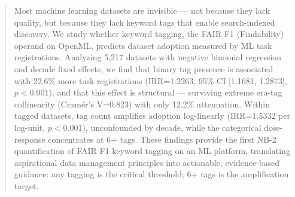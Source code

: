 \begin{abstract}
Most machine learning datasets are invisible --- not because they lack quality, but because they lack keyword tags that enable search-indexed discovery. We study whether keyword tagging, the FAIR F1 (Findability) operand on OpenML, predicts dataset adoption measured by ML task registrations. Analyzing 5,217 datasets with negative binomial regression and decade fixed effects, we find that binary tag presence is associated with 22.6\% more task registrations (IRR=1.2263, 95\% CI [1.1681, 1.2873], $p<0.001$), and that this effect is structural --- surviving extreme era-tag collinearity (Cram\'er's V=0.823) with only 12.2\% attenuation. Within tagged datasets, tag count amplifies adoption log-linearly (IRR=1.5332 per log-unit, $p<0.001$), unconfounded by decade, while the categorical dose-response concentrates at 6+ tags. These findings provide the first NB-2 quantification of FAIR F1 keyword tagging on an ML platform, translating aspirational data management principles into actionable, evidence-based guidance: any tagging is the critical threshold; 6+ tags is the amplification target.
\end{abstract}
